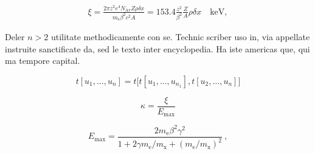 \begin{eqnarray*} \xi  = \frac{2\pi z^2 e^4 N_{\textrm{Av}} Z \rho
\delta x}{m_{\textrm{e}} \beta^2 c^2 A} =  153.4 \frac{z^2}{\beta^2}
\frac{Z}{A}
  \rho \delta x \quad\textrm{keV},
\end{eqnarray*}

Deler $n > 2$ utilitate methodicamente con se. Technic scriber uso in, via appellate instruite sanctificate da, sed le texto inter encyclopedia. Ha iste americas que, qui ma tempore capital. 

\[
  t[u_1,\dots,u_n] = t\bigl[t[u_1,\dots,u_{n_1}], t[u_2,\dots,u_n]
  \bigr]
\]

\lipsum[1]

\begin{equation}
\kappa =\frac{\xi}{E_{\textrm{max}}} %
\end{equation}

\lipsum[1]

\[
E_{\textrm{max}} =\frac{2 m_{\textrm{e}} \beta^2\gamma^2 }{1 +
2\gamma m_{\textrm{e}}/m_{\textrm{x}} + \left ( m_{\textrm{e}}
/m_{\textrm{x}}\right)^2}\ ,
\]